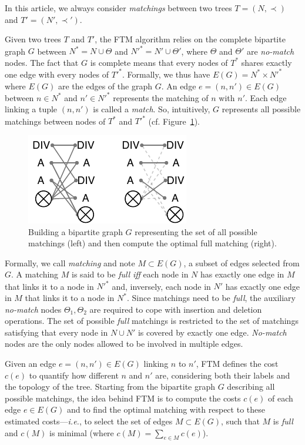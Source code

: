 In this article, we always consider \emph{matchings} between two trees $T=(N,\prec)$ and $T'=(N',\prec')$.

Given two trees $T$ and $T'$, the FTM algorithm relies on the complete bipartite graph $G$ between $N^* = N\cup{\Theta}$ and $N'^* = N'\cup{\Theta}'$, where $\Theta$ and $\Theta'$ are \textit{no-match} nodes.
The fact that $G$ is complete means that every nodes of $T^*$ shares exactly one edge with every nodes of $T'^*$.
Formally, we thus have $E(G) = N^* \times N'^*$ where $E(G)$ are the edges of the graph $G$.
An edge $e=(n, n') \in E(G)$ between $n\in N^*$ and $n'\in N'^*$ represents the matching of $n$ with $n'$. Each edge linking a tuple $(n, n')$ is called a \textit{match}.
So, intuitively, $G$ represents all possible matchings between nodes of $T^*$ and $T'^*$ (cf. Figure~\ref{fig:g_SFTM}).

\begin{figure}
    \centering 
    \includegraphics[width=.5\textwidth]{tree-matching/explanation/g_ftm}
    \caption{Building a bipartite graph $G$ representing the set of all possible matchings (left) and then compute the optimal full matching (right).}
    \label{fig:g_SFTM}%
\end{figure}

Formally, we call \textit{matching} and note $M\subset E(G)$, a subset of edges selected from $G$.
A matching $M$ is said to be \textit{full} \emph{iff} each node in $N$ has exactly one edge in $M$ that links it to a node in $N'^*$ and, inversely, each node in $N'$ has exactly one edge in $M$ that links it to a node in $N^*$.
Since matchings need to be \textit{full}, the auxiliary \textit{no-match} nodes $\Theta_1, \Theta_2$ are required to cope with insertion and deletion operations.
The set of possible \textit{full} matchings is restricted to the set of matchings satisfying that every node in $N \cup N'$ is covered by exactly one edge.
\emph{No-match} nodes are the only nodes allowed to be involved in multiple edges.

Given an edge $e=(n, n')\in E(G)$ linking $n$ to $n'$, FTM defines the cost $c(e)$ to quantify how different $n$ and $n'$ are, considering both their labels and the topology of the tree.
Starting from the bipartite graph $G$ describing all possible matchings, the idea behind FTM is to compute the costs $c(e)$ of each edge $e\in E(G)$ and to find the optimal matching with respect to these estimated costs---\emph{i.e.}, to select the set of edges $M\subset E(G)$, such that $M$ is \textit{full} and $c(M)$ is minimal (where $c(M) = \sum_{e\in M}c(e)$).

